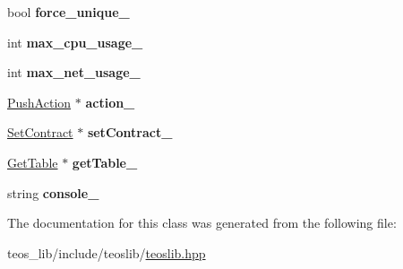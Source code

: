 \begin{DoxyCompactItemize}
bool {\bfseries force\+\_\+unique\+\_\+}
\item 
\mbox{\label{classteoslib_1_1_contract_ad6c29bfc78bc8b1e14cfdf058ac8bc02}} 
int {\bfseries max\+\_\+cpu\+\_\+usage\+\_\+}
\item 
\mbox{\label{classteoslib_1_1_contract_a6c2c7c485f12ca9acd8418034eb12bbd}} 
int {\bfseries max\+\_\+net\+\_\+usage\+\_\+}
\item 
\mbox{\label{classteoslib_1_1_contract_a9b7e6e9177cfd2546a4c522c358e6ed4}} 
\mbox{\hyperlink{classteos_1_1command_1_1_push_action}{Push\+Action}} $\ast$ {\bfseries action\+\_\+}
\item 
\mbox{\label{classteoslib_1_1_contract_a41862408b1f4dfad6cb32ba0c5cf166b}} 
\mbox{\hyperlink{classteos_1_1command_1_1_set_contract}{Set\+Contract}} $\ast$ {\bfseries set\+Contract\+\_\+}
\item 
\mbox{\label{classteoslib_1_1_contract_a1f5351d94cd3092f63b1e7165d510446}} 
\mbox{\hyperlink{classteos_1_1command_1_1_get_table}{Get\+Table}} $\ast$ {\bfseries get\+Table\+\_\+}
\item 
\mbox{\label{classteoslib_1_1_contract_a37390d9bff4c4a595010c052161524df}} 
string {\bfseries console\+\_\+}
\end{DoxyCompactItemize}


The documentation for this class was generated from the following file\+:\begin{DoxyCompactItemize}
\item 
teos\+\_\+lib/include/teoslib/\mbox{\hyperlink{teoslib_8hpp}{teoslib.\+hpp}}\end{DoxyCompactItemize}
